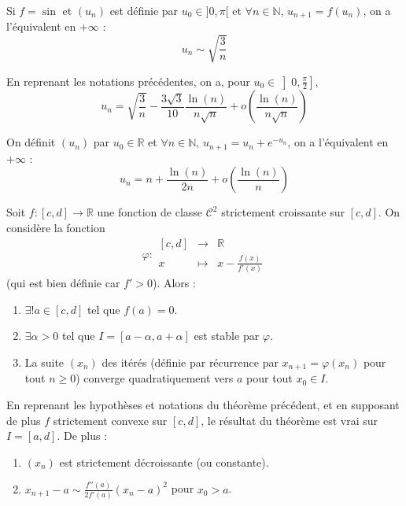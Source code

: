   \begin{example}
    Si $f = \sin$ et $(u_n)$ est définie par $u_0 \in ]0, \pi[$ et $\forall n \in \mathbb{N}, \, u_{n+1} = f(u_n)$, on a l'équivalent en $+\infty$ :
    \[ u_n \sim \sqrt{\frac{3}{n}} \]
  \end{example}


  \begin{proposition}
    En reprenant les notations précédentes, on a, pour $u_0 \in \left] 0, \frac{\pi}{2} \right]$,
    \[ u_n = \sqrt{\frac{3}{n}} - \frac{3 \sqrt{3}}{10} \frac{\ln(n)}{n\sqrt{n}} + o\left( \frac{\ln(n)}{n\sqrt{n}} \right) \]
  \end{proposition}


  \begin{example}
    On définit $(u_n)$ par $u_0 \in \mathbb{R}$ et $\forall n \in \mathbb{N}, \, u_{n+1} = u_n + e^{-u_n}$, on a l'équivalent en $+\infty$ :
    \[ u_n = n + \frac{\ln(n)}{2n} + o\left( \frac{\ln(n)}{n} \right) \]
  \end{example}


  \begin{theorem}
    Soit $f : [c, d] \rightarrow \mathbb{R}$ une fonction de classe $\mathcal{C}^2$ strictement croissante sur $[c, d]$. On considère la fonction
    \[ \varphi :
    \begin{array}{ccc}
      [c, d] &\rightarrow& \mathbb{R} \\
      x &\mapsto& x - \frac{f(x)}{f'(x)}
    \end{array}
    \]
    (qui est bien définie car $f' > 0$). Alors :
    \begin{enumerate}[label={\bfseries(\roman*)}]
      \item $\exists! a \in [c, d]$ tel que $f(a) = 0$.
      \item $\exists \alpha > 0$ tel que $I = [a - \alpha, a + \alpha]$ est stable par $\varphi$.
      \item La suite $(x_n)$ des itérés (définie par récurrence par $x_{n+1} = \varphi(x_n)$ pour tout $n \geq 0$) converge quadratiquement vers $a$ pour tout $x_0 \in I$.
    \end{enumerate}
  \end{theorem}

  \begin{corollary}
    En reprenant les hypothèses et notations du théorème précédent, et en supposant de plus $f$ strictement convexe sur $[c, d]$, le résultat du théorème est vrai sur $I = [a, d]$. De plus :
    \begin{enumerate}[label={\bfseries(\roman*)}]
      \item $(x_n)$ est strictement décroissante (ou constante).
      \item $x_{n+1} - a \sim \frac{f''(a)}{2f'(a)} (x_n - a)^2$ pour $x_0 > a$.
    \end{enumerate}
  \end{corollary}

